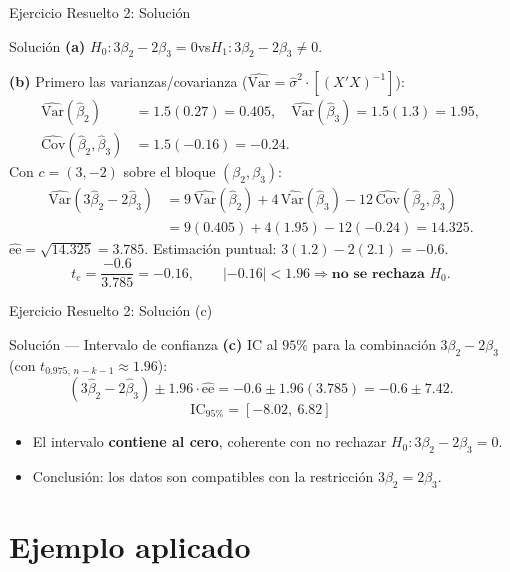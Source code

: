 \documentclass{beamer}
\begin{document}
\begin{frame}{Ejercicio Resuelto 2: Solución}
\begin{exampleblock}{Solución}
\textbf{(a)} $H_0: 3\beta_2 - 2\beta_3 = 0$\quad vs\quad $H_1: 3\beta_2 - 2\beta_3 \neq 0$.

\textbf{(b)} Primero las varianzas/covarianza ($\hat{\text{Var}}=\hat{\sigma}^2\cdot[(X'X)^{-1}]$):
\begin{align*}
\hat{\text{Var}}(\hat{\beta}_2)&=1{.}5(0{.}27)=0{.}405,\quad \hat{\text{Var}}(\hat{\beta}_3)=1{.}5(1{.}3)=1{.}95,\\
\hat{\text{Cov}}(\hat{\beta}_2,\hat{\beta}_3)&=1{.}5(-0{.}16)=-0{.}24.
\end{align*}
Con $c=(3,-2)$ sobre el bloque $(\beta_2,\beta_3)$:
\begin{align*}
\hat{\text{Var}}(3\hat{\beta}_2-2\hat{\beta}_3)&=9\,\hat{\text{Var}}(\hat{\beta}_2)+4\,\hat{\text{Var}}(\hat{\beta}_3)-12\,\hat{\text{Cov}}(\hat{\beta}_2,\hat{\beta}_3)\\
&=9(0{.}405)+4(1{.}95)-12(-0{.}24)=14{.}325.
\end{align*}
$\widehat{\text{ee}}=\sqrt{14{.}325}=3{.}785$. Estimación puntual: $3(1{.}2)-2(2{.}1)=-0{.}6$.
\[
t_e=\frac{-0{.}6}{3{.}785}=-0{.}16,\qquad |{-0{.}16}|<1{.}96 \Rightarrow \textbf{no se rechaza } H_0.
\]
\end{exampleblock}
\end{frame}

\begin{frame}{Ejercicio Resuelto 2: Solución (c)}
\begin{exampleblock}{Solución — Intervalo de confianza}
\textbf{(c)} IC al $95\%$ para la combinación $3\beta_2-2\beta_3$ (con $t_{0.975,\,n-k-1}\approx 1{.}96$):
\[
(3\hat{\beta}_2-2\hat{\beta}_3)\pm 1{.}96\cdot\widehat{\text{ee}} = -0{.}6 \pm 1{.}96(3{.}785) = -0{.}6 \pm 7{.}42.
\]
\[
\boxed{\ \text{IC}_{95\%} = [-8{.}02,\ 6{.}82]\ }
\]
\begin{itemize}
    \item El intervalo \textbf{contiene al cero}, coherente con no rechazar $H_0:3\beta_2-2\beta_3=0$.
    \item Conclusión: los datos son compatibles con la restricción $3\beta_2=2\beta_3$.
\end{itemize}
\end{exampleblock}
\end{frame}

\section{Ejemplo aplicado}
\end{document}
